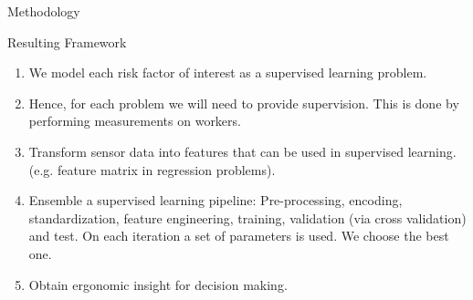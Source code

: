 \begin{frame}{Methodology}
    \begin{alertblock}{Resulting Framework}
        \begin{enumerate}
            \item We model each risk factor of interest as a supervised learning problem.
            \item Hence, for each problem we will need to provide supervision. This is done by performing measurements on workers.
            \item Transform sensor data into features that can be used in supervised learning. (e.g. feature matrix in regression problems).
            \item Ensemble a supervised learning pipeline: Pre-processing, encoding, standardization, feature engineering, training, validation (via cross validation) and test. On each
            iteration a set of parameters is used. We choose the best one.
            \item Obtain ergonomic insight for decision making.
        \end{enumerate}
    \end{alertblock}
\end{frame}


